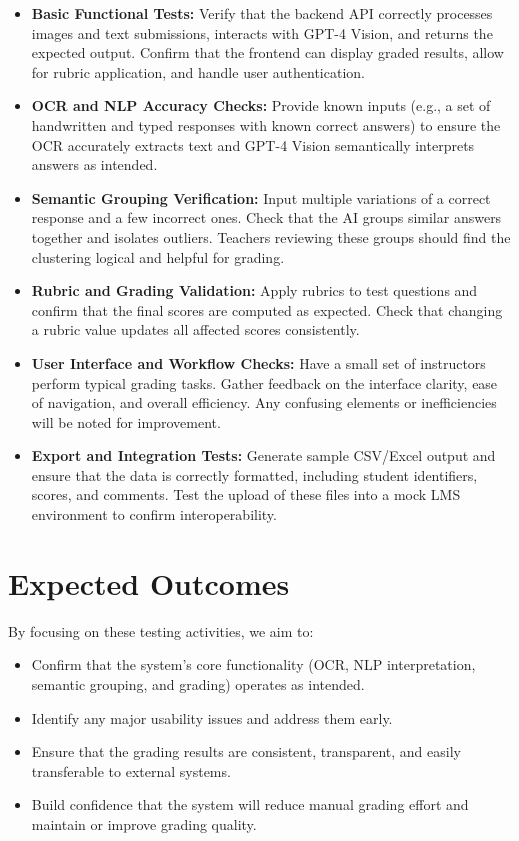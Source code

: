 \documentclass[ms,twoside,print]{nuthesis}
\begin{document}
\begin{itemize}
    \item \textbf{Basic Functional Tests:}  
    Verify that the backend API correctly processes images and text submissions, interacts with GPT-4 Vision, and returns the expected output. Confirm that the frontend can display graded results, allow for rubric application, and handle user authentication.

    \item \textbf{OCR and NLP Accuracy Checks:}  
    Provide known inputs (e.g., a set of handwritten and typed responses with known correct answers) to ensure the OCR accurately extracts text and GPT-4 Vision semantically interprets answers as intended.

    \item \textbf{Semantic Grouping Verification:}  
    Input multiple variations of a correct response and a few incorrect ones. Check that the AI groups similar answers together and isolates outliers. Teachers reviewing these groups should find the clustering logical and helpful for grading.

    \item \textbf{Rubric and Grading Validation:}  
    Apply rubrics to test questions and confirm that the final scores are computed as expected. Check that changing a rubric value updates all affected scores consistently.

    \item \textbf{User Interface and Workflow Checks:}  
    Have a small set of instructors perform typical grading tasks. Gather feedback on the interface clarity, ease of navigation, and overall efficiency. Any confusing elements or inefficiencies will be noted for improvement.

    \item \textbf{Export and Integration Tests:}  
    Generate sample CSV/Excel output and ensure that the data is correctly formatted, including student identifiers, scores, and comments. Test the upload of these files into a mock LMS environment to confirm interoperability.
\end{itemize}

\section{Expected Outcomes}

By focusing on these testing activities, we aim to:

\begin{itemize}
    \item Confirm that the system’s core functionality (OCR, NLP interpretation, semantic grouping, and grading) operates as intended.
    \item Identify any major usability issues and address them early.
    \item Ensure that the grading results are consistent, transparent, and easily transferable to external systems.
    \item Build confidence that the system will reduce manual grading effort and maintain or improve grading quality.
\end{itemize}
\end{document}
